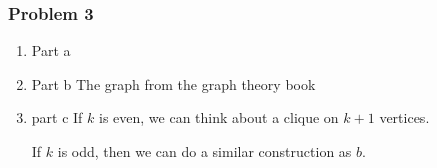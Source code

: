 \documentclass[11pt]{article}
\begin{document}
\subsubsection{Problem 3}
\label{sec:org5ff90e8}
\begin{enumerate}
\item Part a
\label{sec:org8507207}
\item Part b
\label{sec:org17bfee6}
The graph from the graph theory book
\item part c
\label{sec:orgb8204c4}
If \(k\) is even, we can think about a clique on \(k+1\) vertices.

If \(k\) is odd, then we can do a similar construction as \(b\).
\end{enumerate}
\end{document}
